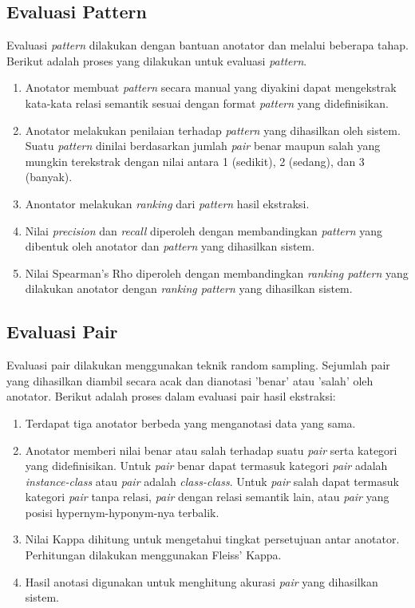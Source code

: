 \subsection{Evaluasi Pattern}
Evaluasi \textit{pattern} dilakukan dengan bantuan anotator dan melalui beberapa tahap. Berikut adalah proses yang dilakukan untuk evaluasi \textit{pattern}.
\begin{enumerate}
  \item Anotator membuat \textit{pattern} secara manual yang diyakini dapat mengekstrak kata-kata relasi semantik sesuai dengan format \textit{pattern} yang didefinisikan.
  \item Anotator melakukan penilaian terhadap \textit{pattern} yang dihasilkan oleh sistem. Suatu \textit{pattern} dinilai berdasarkan jumlah \textit{pair} benar maupun salah yang mungkin terekstrak dengan nilai antara 1 (sedikit), 2 (sedang), dan 3 (banyak).
  \item Anontator melakukan \textit{ranking} dari \textit{pattern} hasil ekstraksi.
  \item Nilai \textit{precision} dan \textit{recall} diperoleh dengan membandingkan \textit{pattern} yang dibentuk oleh anotator dan \textit{pattern} yang dihasilkan sistem.
  \item Nilai Spearman's Rho diperoleh dengan membandingkan \textit{ranking pattern} yang dilakukan anotator dengan \textit{ranking pattern} yang dihasilkan sistem.
\end{enumerate}

\subsection{Evaluasi Pair}
Evaluasi pair dilakukan menggunakan teknik random sampling. Sejumlah pair yang dihasilkan diambil secara acak dan dianotasi 'benar' atau 'salah' oleh anotator. Berikut adalah proses dalam evaluasi pair hasil ekstraksi:
\begin{enumerate}
  \item Terdapat tiga anotator berbeda yang menganotasi data yang sama. 
  \item Anotator memberi nilai benar atau salah terhadap suatu \textit{pair} serta kategori yang didefinisikan. Untuk \textit{pair} benar dapat termasuk kategori \textit{pair} adalah \textit{instance-class} atau \textit{pair} adalah \textit{class-class}. Untuk \textit{pair} salah dapat termasuk kategori \textit{pair} tanpa relasi, \textit{pair} dengan relasi semantik lain, atau \textit{pair} yang posisi hypernym-hyponym-nya terbalik. 
  \item Nilai Kappa dihitung untuk mengetahui tingkat persetujuan antar anotator. Perhitungan dilakukan menggunakan Fleiss' Kappa.
  \item Hasil anotasi digunakan untuk menghitung akurasi \textit{pair} yang dihasilkan sistem.
\end{enumerate}


